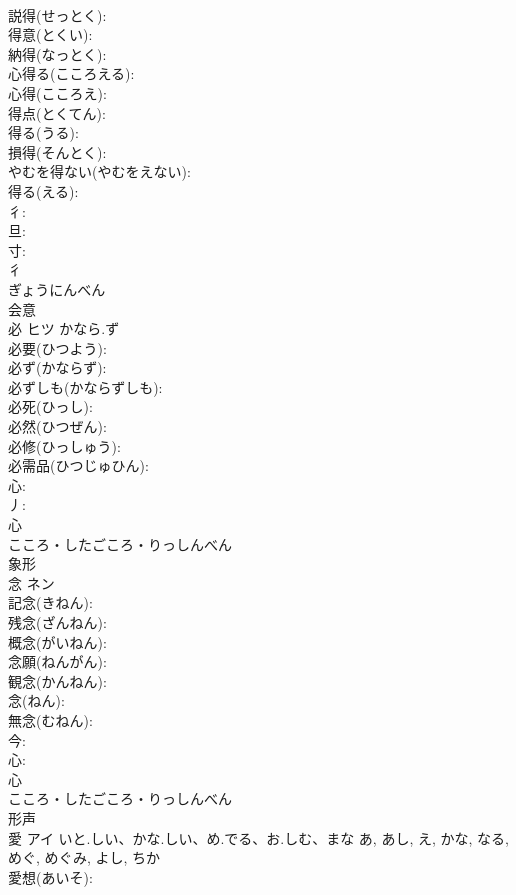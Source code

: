 \documentclass[8pt]{extreport}
\begin{document}
\begin{CJK}{UTF8}{min}
\\	説得(せっとく): 
\\	得意(とくい): 
\\	納得(なっとく): 
\\	心得る(こころえる): 
\\	心得(こころえ): 
\\	得点(とくてん): 
\\	得る(うる): 
\\	損得(そんとく): 
\\	やむを得ない(やむをえない): 
\\	得る(える): 
\\	彳: 
\\	旦: 
\\	寸: 
\\	彳	
\\	ぎょうにんべん	
\\	会意 
\\	必	ヒツ	かなら.ず		
\\	必要(ひつよう): 
\\	必ず(かならず): 
\\	必ずしも(かならずしも): 
\\	必死(ひっし): 
\\	必然(ひつぜん): 
\\	必修(ひっしゅう): 
\\	必需品(ひつじゅひん): 
\\	心: 
\\	丿: 
\\	心	
\\	こころ・したごころ・りっしんべん	
\\	象形 
\\	念	ネン			
\\	記念(きねん): 
\\	残念(ざんねん): 
\\	概念(がいねん): 
\\	念願(ねんがん): 
\\	観念(かんねん): 
\\	念(ねん): 
\\	無念(むねん): 
\\	今: 
\\	心: 
\\	心	
\\	こころ・したごころ・りっしんべん	
\\	形声 
\\	愛	アイ	いと.しい、かな.しい、め.でる、お.しむ、まな	あ, あし, え, かな, なる, めぐ, めぐみ, よし, ちか	
\\	愛想(あいそ): 

\end{CJK}
\end{document}
